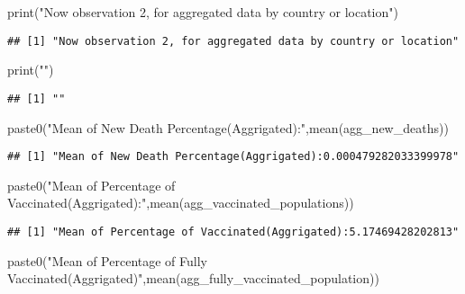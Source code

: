 \documentclass[
  12pt,
]{article}
\newenvironment{Shaded}{\begin{snugshade}}{\end{snugshade}}
\newcommand{\FunctionTok}[1]{\textcolor[rgb]{0.00,0.00,0.00}{#1}}
\newcommand{\NormalTok}[1]{#1}
\newcommand{\StringTok}[1]{\textcolor[rgb]{0.31,0.60,0.02}{#1}}
\begin{document}
\begin{Shaded}
\begin{Highlighting}[]
\FunctionTok{print}\NormalTok{(}\StringTok{"Now observation 2, for aggregated data by country or location"}\NormalTok{)}
\end{Highlighting}
\end{Shaded}

\begin{verbatim}
## [1] "Now observation 2, for aggregated data by country or location"
\end{verbatim}

\begin{Shaded}
\begin{Highlighting}[]
\FunctionTok{print}\NormalTok{(}\StringTok{""}\NormalTok{)}
\end{Highlighting}
\end{Shaded}

\begin{verbatim}
## [1] ""
\end{verbatim}

\begin{Shaded}
\begin{Highlighting}[]
\FunctionTok{paste0}\NormalTok{(}\StringTok{"Mean of New Death Percentage(Aggrigated):"}\NormalTok{,}\FunctionTok{mean}\NormalTok{(agg\_new\_deaths))}
\end{Highlighting}
\end{Shaded}

\begin{verbatim}
## [1] "Mean of New Death Percentage(Aggrigated):0.000479282033399978"
\end{verbatim}

\begin{Shaded}
\begin{Highlighting}[]
\FunctionTok{paste0}\NormalTok{(}\StringTok{"Mean of Percentage of Vaccinated(Aggrigated):"}\NormalTok{,}\FunctionTok{mean}\NormalTok{(agg\_vaccinated\_populations))}
\end{Highlighting}
\end{Shaded}

\begin{verbatim}
## [1] "Mean of Percentage of Vaccinated(Aggrigated):5.17469428202813"
\end{verbatim}

\begin{Shaded}
\begin{Highlighting}[]
\FunctionTok{paste0}\NormalTok{(}\StringTok{"Mean of Percentage of Fully Vaccinated(Aggrigated)"}\NormalTok{,}\FunctionTok{mean}\NormalTok{(agg\_fully\_vaccinated\_population))}
\end{Highlighting}
\end{Shaded}
\end{document}
